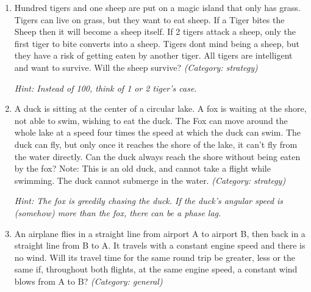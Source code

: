 \begin{enumerate}
\item Hundred tigers and one sheep are put on a magic island that only has grass. Tigers can live on grass, but they want to eat sheep. If a Tiger bites the Sheep then it will become a sheep itself. If 2 tigers attack a sheep, only the first tiger to bite converts into a sheep. Tigers dont mind being a sheep, but they have a risk of getting eaten by another tiger. All tigers are intelligent and want to survive. Will the sheep survive?
\small\emph{(Category: strategy)}

\small\emph{Hint: Instead of 100, think of 1 or 2 tiger's case.}





\item A duck is sitting at the center of a circular lake. A fox is waiting at the shore, not able to swim, wishing to eat the duck. The Fox can move around the whole lake at a speed four times the speed at which the duck can swim. The duck can fly, but only once it reaches the shore of the lake, it can't fly from the water directly. Can the duck always reach the shore without being eaten by the fox?
Note: This is an old duck, and cannot take a flight while swimming. The duck cannot submerge in the water.
\small\emph{(Category: strategy)}

\small\emph{Hint: The fox is greedily chasing the duck. If the duck's angular speed is (somehow) more than the fox, there can be a phase lag.}





\item An airplane flies in a straight line from airport A to airport B, then back in a straight line from B to A. It travels with a constant engine speed and there is no wind. Will its travel time for the same round trip be greater, less or the same if, throughout both flights, at the same engine speed, a constant wind blows from A to B?
\small\emph{(Category: general)}





\end{enumerate}
